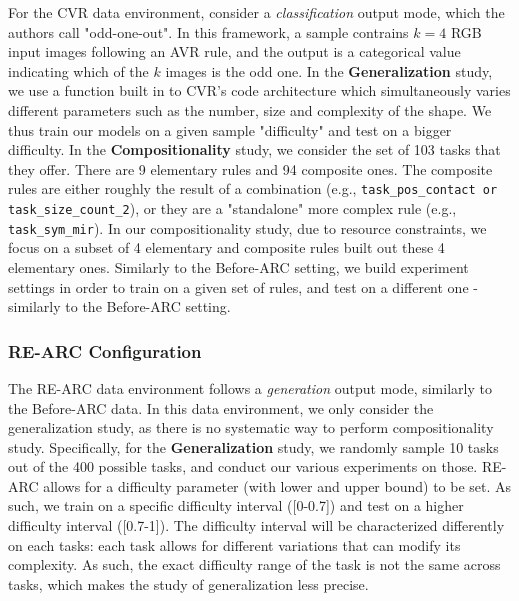For the CVR \cite{cvr2022} data environment, consider a \textit{classification} output mode, which the authors call "odd-one-out". In this framework, a sample contrains $k=4$ RGB input images following an AVR rule, and the output is a categorical value indicating which of the $k$ images is the odd one. In the \textbf{Generalization} study, we use a function built in to CVR's code architecture which simultaneously varies different parameters such as the number, size and complexity of the shape. We thus train our models on a given sample "difficulty" and test on a bigger difficulty. In the \textbf{Compositionality} study, we consider the set of 103 tasks that they offer. There are 9 elementary rules and 94 composite ones. The composite rules are either roughly the result of a combination (e.g., \texttt{task\_pos\_contact or task\_size\_count\_2}), or they are a "standalone" more complex rule (e.g., \texttt{task\_sym\_mir}). In our compositionality study, due to resource constraints, we focus on a subset of 4 elementary and composite rules built out these 4 elementary ones. Similarly to the Before-ARC setting, we build experiment settings in order to train on a given set of rules, and test on a different one - similarly to the Before-ARC setting.

\subsubsection{RE-ARC Configuration}\label{rearc}

The RE-ARC \cite{reverse_engineer_hodel} data environment follows a \textit{generation} output mode, similarly to the Before-ARC data. In this data environment, we only consider the generalization study, as there is no systematic way to perform compositionality study. Specifically, for the \textbf{Generalization} study, we randomly sample 10 tasks out of the 400 possible tasks, and conduct our various experiments on those. RE-ARC allows for a difficulty parameter (with lower and upper bound) to be set. As such, we train on a specific difficulty interval ([0-0.7]) and test on a higher difficulty interval ([0.7-1]). The difficulty interval will be characterized differently on each tasks: each task allows for different variations that can modify its complexity. As such, the exact difficulty range of the task is not the same across tasks, which makes the study of generalization less precise.
